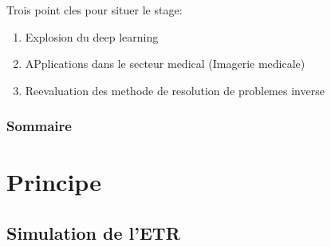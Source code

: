 \documentclass[xcolor=dvipsnames]{beamer} %
\begin{document}
\begin{frame}
  Trois point cles pour situer le stage:
  \begin{enumerate}
    \item Explosion du deep learning %
    \item APplications dans le secteur medical (Imagerie medicale) %
    \item Reevaluation des methode de resolution de problemes inverse %
  \end{enumerate}
  
\end{frame}

\begin{frame}
  \scriptsize
  \frametitle{Sommaire}
  \tableofcontents
\end{frame}

\section{Principe}

\subsection{Simulation de l'ETR}
\end{document}
